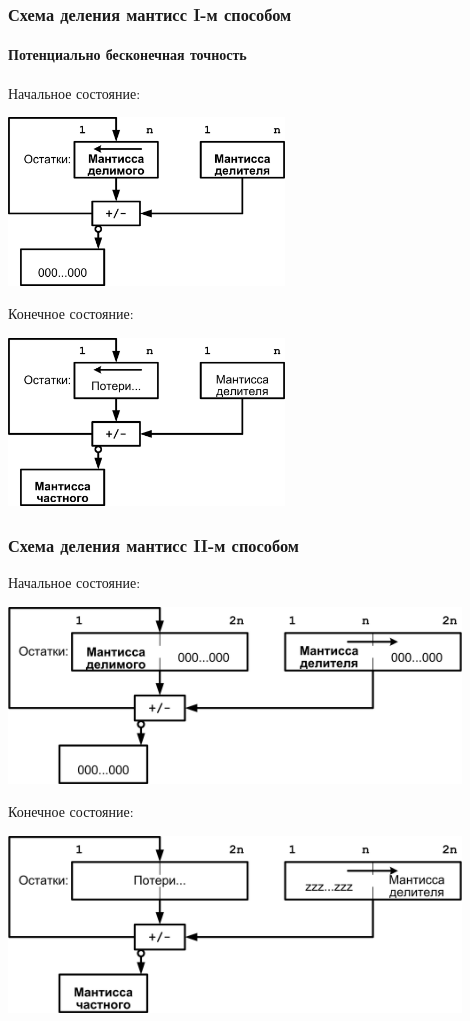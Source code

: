 \begin{frame}
    \frametitle{Схема деления мантисс I-м способом}
    \framesubtitle{Потенциально бесконечная точность}

     {
        Начальное состояние:
        \begin{center}
            \includegraphics[width=0.55\textwidth]{fig/ibegin}
        \end{center}
    }
     {
        Конечное состояние:
        \begin{center}
            \includegraphics[width=0.55\textwidth]{fig/iend}
        \end{center}
    }
\end{frame}

\begin{frame}
    \frametitle{Схема деления мантисс II-м способом}

     {
        Начальное состояние:
        \begin{center}
            \includegraphics[width=0.9\textwidth]{fig/iibegin}
        \end{center}
    }
     {
        Конечное состояние:
        \begin{center}
            \includegraphics[width=0.9\textwidth]{fig/iiend}
        \end{center}
    }
\end{frame}

